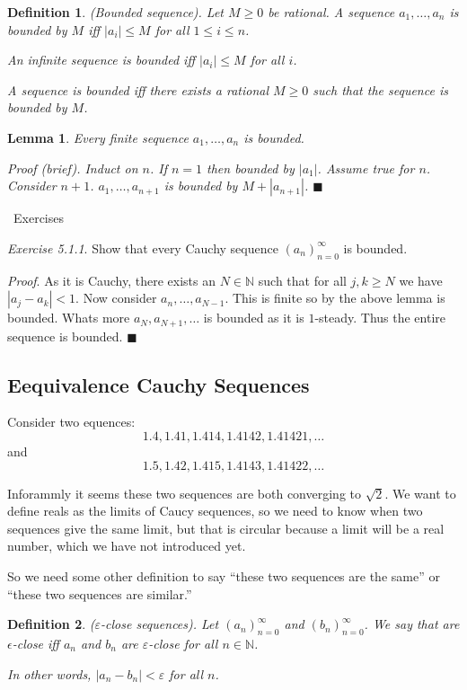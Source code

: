 \documentclass{article}
\newtheorem{definition}{Definition}[subsection]
\newtheorem{lemma}{Lemma}[subsection]
\newcommand{\N}{\mathbb{N}}
\newcommand{\exercisesline}{	%
    \begin{center}
    \textemdash\ Exercises\ \textemdash
    \end{center}
}
\newcommand{\vep}{\varepsilon} %
\let\it\textit
\begin{document}
\begin{definition}
	(Bounded sequence). Let $M \geq 0$ be rational. A sequence 
	$a_1, \dots, a_n$
	is bounded by $M$ iff $|a_i| \leq M$ for all $1 \leq i \leq n$.

	An infinite sequence is bounded iff $|a_i| \leq M$ for all $i$.

	A sequence is bounded iff there exists a rational $M \geq 0$ such that
	the sequence is bounded by $M$.
\end{definition}

\begin{lemma}
	Every finite sequence $a_1, \dots, a_n$ is bounded.	

	\it{Proof} (brief). Induct on $n$. If $n=1$ then 
	bounded by $|a_1|$. Assume true for $n$. Consider $n+1$.
	$a_1, \dots, a_{n+1}$ is bounded by $M + |a_{n+1}|$.
	\hfill $\blacksquare$
\end{lemma}

\exercisesline

\it{Exercise 5.1.1}. Show that every Cauchy sequence 
$(a_n)_{n=0}^\infty$ is bounded. 

\it{Proof}. As it is Cauchy, there exists an $N \in \N$ such that 
for all $j,k  \geq N$ we have $|a_j - a_k| < 1$. Now 
consider $a_n, \dots, a_{N-1}$. This is finite so by the above 
lemma is bounded. Whats more $a_{N}, a_{N+1}, \dots$ is 
bounded as it is $1$-steady. Thus the entire sequence is
bounded. \hfill $\blacksquare$


\subsection{Eequivalence Cauchy Sequences}

Consider two equences:
$$
1.4, 1.41, 1.414, 1.4142, 1.41421, \ldots
$$
and 
$$
1.5, 1.42, 1.415, 1.4143, 1.41422, \ldots
$$

Inforammly it seems these two sequences are both converging 
to $\sqrt{2}$.  We want to define reals as the limits 
of Caucy sequences, so we need to know when two sequences 
give the same limit, but that is circular because a limit 
will be a real number, which we have not introduced yet.

So we need some other definition to say ``these two sequences 
are the same'' or ``these two sequences are similar.''

\begin{definition}
	($\vep$-close sequences). Let $(a_n)_{n=0}^\infty$ and
	$(b_n)_{n=0}^\infty$. We say that are $\epsilon$-close 
	iff $a_n$ and $b_n$ are $\vep$-close for all $n \in\N$.

	In other words, $|a_n - b_n| < \vep$ for all $n$.
\end{definition}
\end{document}
